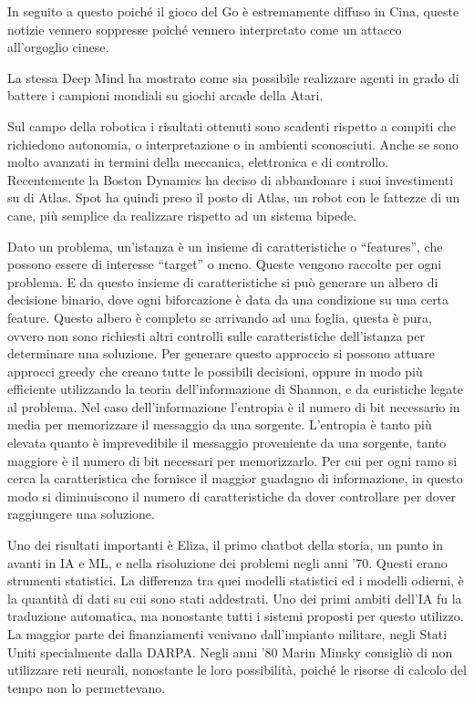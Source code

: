 \documentclass{article}
\numberwithin{equation}{subsection}
\begin{document}
In seguito a questo poiché il gioco del Go è estremamente diffuso in Cina, queste notizie vennero soppresse poiché vennero interpretato come un attacco all'orgoglio cinese. 

La stessa Deep Mind ha mostrato come sia possibile realizzare agenti in grado di battere i campioni mondiali su giochi arcade della Atari. 

Sul campo della robotica i risultati ottenuti sono scadenti rispetto a compiti che richiedono autonomia, o interpretazione o in ambienti sconosciuti. Anche se sono molto avanzati in termini della meccanica, elettronica e di controllo. 
Recentemente la Boston Dynamics ha deciso di abbandonare i suoi investimenti su di Atlas. 
Spot ha quindi preso il posto di Atlas, un robot con le fattezze di un cane, più semplice da realizzare rispetto ad un sistema bipede. 

Dato un problema, un'istanza è un insieme di caratteristiche o ``features'', che possono essere di interesse ``target'' o meno. Queste vengono raccolte per ogni 
problema. E da questo insieme di caratteristiche si può generare un albero di decisione binario, dove ogni biforcazione è data da una condizione su una certa 
feature. Questo albero è completo se arrivando ad una foglia, questa è pura, ovvero non sono richiesti altri controlli sulle caratteristiche dell'istanza per 
determinare una soluzione. 
Per generare questo approccio si possono attuare approcci greedy che creano tutte le possibili decisioni, oppure in modo più efficiente utilizzando la 
teoria dell'informazione di Shannon, e da euristiche legate al problema. Nel caso dell'informazione l'entropia è il numero di bit necessario in media per memorizzare 
il messaggio da una sorgente. L'entropia è tanto più elevata quanto è imprevedibile il messaggio proveniente da una sorgente, tanto maggiore è il numero di bit 
necessari per memorizzarlo. 
Per cui per ogni ramo si cerca la caratteristica che fornisce il maggior guadagno di informazione, in questo modo si diminuiscono il numero di 
caratteristiche da dover controllare per dover raggiungere una soluzione. 

Uno dei risultati importanti è Eliza, il primo chatbot della storia, un punto in avanti in IA e ML, e nella risoluzione dei problemi negli anni '70. Questi erano 
strumenti statistici. La differenza tra quei modelli statistici ed i modelli odierni, è la quantità di dati su cui sono stati addestrati. Uno dei primi ambiti dell'IA 
fu la traduzione automatica, ma nonostante tutti i sistemi proposti per questo utilizzo. La maggior parte dei finanziamenti venivano dall'impianto militare, negli Stati 
Uniti specialmente dalla DARPA. Negli anni '80 Marin Minsky consigliò di non utilizzare reti neurali, nonostante le loro possibilità, poiché le risorse di calcolo 
del tempo non lo permettevano. 
\end{document}
